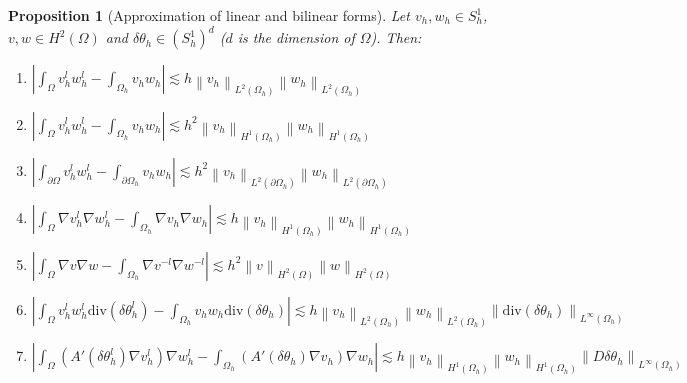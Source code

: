 \documentclass[english,a4paper,10pt,oneside]{scrbook}	%
\theoremstyle{break}
\newtheorem{prop}[equation]{Proposition}
\theoremstyle{remark}
\newcommand{\ds}{\displaystyle}
\newcommand{\norm}[1]{\left\lVert#1\right\rVert}
\newcommand{\te}{\theta}
\newcommand{\dive}{\text{div}}
\begin{document}
\begin{prop}[Approximation of linear and bilinear forms]
\label{prop:lin_appr}
Let $v_h, w_h \in S^1_h$, $v,w \in H^2(\Omega)$ and $\delta \te_h \in (S^1_h)^d$ ($d$ is the dimension of $\Omega$). Then:

\begin{enumerate}
	\item $\ds \left | \int_\Omega v_h^lw_h^l - \int_{\Omega_h}v_hw_h\right |\lesssim h \norm{v_h}_{L^2(\Omega_h)}\norm{w_h}_{L^2(\Omega_h)}$
	\item $\ds \left | \int_\Omega v_h^lw_h^l - \int_{\Omega_h}v_hw_h\right |\lesssim h^2 \norm{v_h}_{H^1(\Omega_h)}\norm{w_h}_{H^1(\Omega_h)}$
	\item $\ds \left | \int_{\partial \Omega} v_h^lw_h^l - \int_{\partial \Omega_h}v_hw_h\right |\lesssim h^2 \norm{v_h}_{L^2(\partial \Omega_h)}\norm{w_h}_{L^2(\partial \Omega_h)}$
	\item $\ds \left | \int_\Omega \nabla v_h^l\nabla w_h^l - \int_{\Omega_h}\nabla v_h\nabla w_h\right |\lesssim h \norm{v_h}_{H^1(\Omega_h)}\norm{w_h}_{H^1(\Omega_h)}$
	\item $\ds \left | \int_\Omega \nabla v\nabla w - \int_{\Omega_h}\nabla v^{-l}\nabla w^{-l}\right |\lesssim h^2 \norm{v}_{H^2(\Omega)}\norm{w}_{H^2(\Omega)}$
	\item $\ds \left | \int_\Omega v_h^lw_h^l \dive(\delta  \te_h^l) - \int_{\Omega_h}v_h w_h \dive(\delta \te_h)\right |\lesssim h \norm{v_h}_{L^2(\Omega_h)}\norm{w_h}_{L^2(\Omega_h)} \norm{\dive(\delta \te_h)}_{L^\infty(\Omega_h)}$
	\item $\ds \left | \int_\Omega (A'(\delta	\te_h^l)\nabla v_h^l)\nabla w_h^l - \int_{\Omega_h}(A'(\delta	\te_h)\nabla v_h)\nabla w_h\right |\lesssim h \norm{v_h}_{H^1(\Omega_h)}\norm{w_h}_{H^1(\Omega_h)}\norm{D\delta \te_h}_{L^\infty(\Omega_h)}$
\end{enumerate}
\end{prop}
\end{document}
